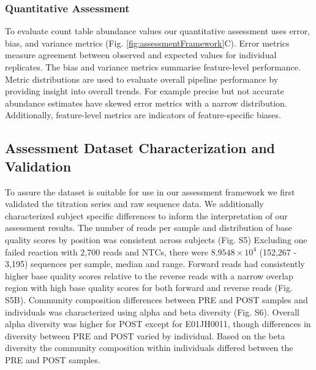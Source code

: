 \documentclass{bmcart}
\begin{document}
\subsubsection*{Quantitative Assessment}
To evaluate count table abundance values our quantitative assessment uses error, bias, and variance metrics (Fig. \ref{fig:assessmentFramework}C).
Error metrics measure agreement between observed and expected values for individual replicates.
The bias and variance metrics summarise feature-level performance.
Metric distributions are used to evaluate overall pipeline performance by providing insight into overall trends.
For example precise but not accurate abundance estimates have skewed error metrics with a narrow distribution.
Additionally, feature-level metrics are indicators of feature-specific biases.

\subsection*{Assessment Dataset Characterization and Validation}
To assure the dataset is suitable for use in our assessment framework we first validated the titration series and raw sequence data.
We additionally characterized subject specific differences to inform the interpretation of our assessment results.
The number of reads per sample and distribution of base quality scores by position was consistent across subjects (Fig. S5)
Excluding one failed reaction with 2,700 reads and NTCs, there
were \(8.9548\times 10^{4}\) (152,267 - 3,195) sequences per sample, median and
range. Forward reads had consistently higher base quality scores relative to
the reverse reads with a narrow overlap region with high base quality scores
for both forward and reverse reads (Fig. S5B).
Community composition differences between PRE and POST samples and individuals was characterized using alpha and beta diversity (Fig. S6). 
Overall alpha diversity was higher for POST except for E01JH0011, 
though differences in diversity between PRE and POST varied by individual. 
Based on the beta diversity the community composition within individuals differed between the PRE and POST samples. 
\end{document}
